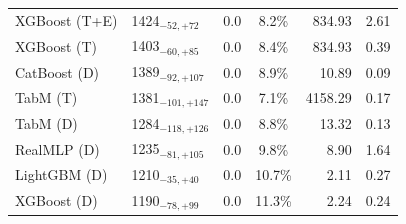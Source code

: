 \begin{tabular}{llccrr}
XGBoost (T+E) & 1424${}_{-52,+72}$ & 0.0 & 8.2\% & 834.93 & 2.61 \\
XGBoost (T) & 1403${}_{-60,+85}$ & 0.0 & 8.4\% & 834.93 & 0.39 \\
CatBoost (D) & 1389${}_{-92,+107}$ & 0.0 & 8.9\% & 10.89 & 0.09 \\
TabM (T) & 1381${}_{-101,+147}$ & 0.0 & 7.1\% & 4158.29 & 0.17 \\
TabM (D) & 1284${}_{-118,+126}$ & 0.0 & 8.8\% & 13.32 & 0.13 \\
RealMLP (D) & 1235${}_{-81,+105}$ & 0.0 & 9.8\% & 8.90 & 1.64 \\
LightGBM (D) & 1210${}_{-35,+40}$ & 0.0 & 10.7\% & 2.11 & 0.27 \\
XGBoost (D) & 1190${}_{-78,+99}$ & 0.0 & 11.3\% & 2.24 & 0.24 \\
\bottomrule
\end{tabular}
